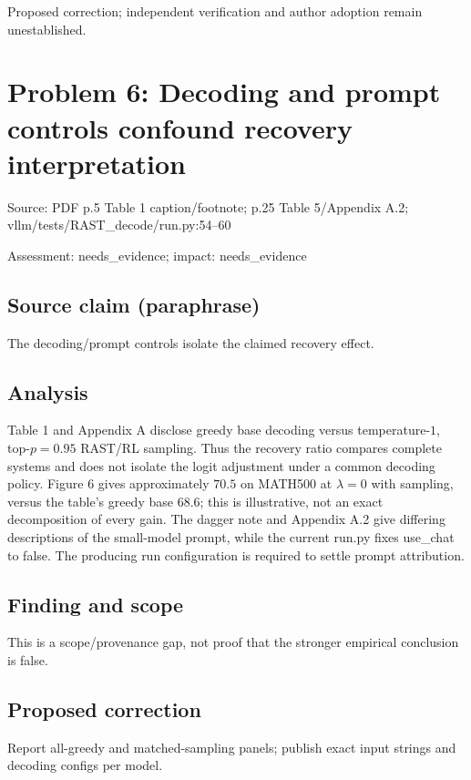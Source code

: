 \documentclass[11pt]{article}
\begin{document}
Proposed correction; independent verification and author adoption remain unestablished.

\section*{Problem 6: Decoding and prompt controls confound recovery interpretation}

Source: PDF p.5 Table 1 caption/footnote; p.25 Table 5/Appendix A.2; vllm/tests/RAST\_decode/run.py:54–60

Assessment: needs\_evidence; impact: needs\_evidence

\subsection*{Source claim (paraphrase)}

The decoding/prompt controls isolate the claimed recovery effect.

\subsection*{Analysis}

Table 1 and Appendix A disclose greedy base decoding versus temperature-\(1\), top-\(p=0.95\) RAST/RL sampling. Thus the recovery ratio compares complete systems and does not isolate the logit adjustment under a common decoding policy. Figure 6 gives approximately \(70.5\) on MATH500 at \(\lambda=0\) with sampling, versus the table’s greedy base \(68.6\); this is illustrative, not an exact decomposition of every gain. The dagger note and Appendix A.2 give differing descriptions of the small-model prompt, while the current run.py fixes use\_chat to false. The producing run configuration is required to settle prompt attribution.

\subsection*{Finding and scope}

This is a scope/provenance gap, not proof that the stronger empirical conclusion is false.

\subsection*{Proposed correction}

Report all-greedy and matched-sampling panels; publish exact input strings and decoding configs per model.
\end{document}
